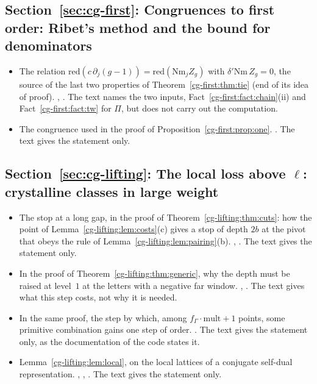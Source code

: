 \subsection*{Section~\ref{sec:cg-first}: Congruences to first order: Ribet's method and the bound for denominators}
\begin{itemize}[leftmargin=2em,itemsep=1pt]
\item The relation $\mathrm{red}(c\,\partial_j(g-1))=\mathrm{red}(\mathrm{Nm}_jZ_g)$ with
  $\delta'\mathrm{Nm}\,Z_g=0$, the source of the last two properties of
  Theorem~\ref{cg-first:thm:tie} (end of its idea of proof).
  ,
  . The text names the two inputs,
  Fact~\ref{cg-first:fact:chain}(ii) and Fact~\ref{cg-first:fact:tw} for $\Pi$, but does not carry
  out the computation.
\item The congruence used in the proof of Proposition~\ref{cg-first:prop:one}.
  . The text gives the statement only.
\end{itemize}

\subsection*{Section~\ref{sec:cg-lifting}: The local loss above \texorpdfstring{$\ell$}{l}: crystalline classes in large weight}
\begin{itemize}[leftmargin=2em,itemsep=1pt]
\item The stop at a long gap, in the proof of Theorem~\ref{cg-lifting:thm:cuts}: how the point of
  Lemma~\ref{cg-lifting:lem:costs}(c) gives a stop of depth $2b$ at the pivot that obeys the rule
  of Lemma~\ref{cg-lifting:lem:pairing}(b).
  ,
  . The text gives the
  statement only.
\item In the proof of Theorem~\ref{cg-lifting:thm:generic}, why the depth must be raised at
  level~$1$ at the letters with a negative far window.
  ,
  . The text gives what
  this step costs, not why it is needed.
\item In the same proof, the step by which, among $f_\Gamma\cdot\mathrm{mult}+1$ points, some
  primitive combination gains one step of order.
  . The text gives the
  statement only, as the documentation of the code states it.
\item Lemma~\ref{cg-lifting:lem:local}, on the local lattices of a conjugate self-dual
  representation. ,
  ,
  . The text gives the statement only.
\end{itemize}

\endgroup
